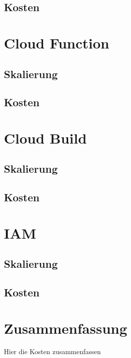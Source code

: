 \subsection*{Kosten}
\sblindtext


\section{Cloud Function}
\blindtext

\subsection*{Skalierung}
\blindtext

\subsection*{Kosten}
\sblindtext


\section{Cloud Build}
\blindtext

\subsection*{Skalierung}
\blindtext

\subsection*{Kosten}
\sblindtext


\section{IAM}
\blindtext

\subsection*{Skalierung}
\blindtext

\subsection*{Kosten}
\sblindtext



\section{Zusammenfassung}
Hier die Kosten zusammenfassen